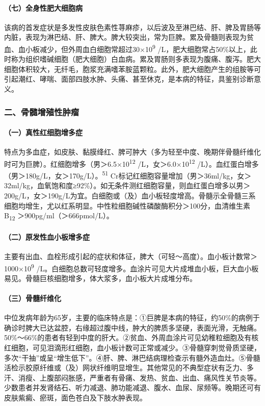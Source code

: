 \paragraph{（七）全身性肥大细胞病}

该病的首发症状是多发性皮肤色素性荨麻疹，以后波及至淋巴结、肝、脾及胃肠等内脏，表现为淋巴结、肝、脾大。脾大较突出，常为巨脾。累及骨髓则表现为贫血、血小板减少，但外周血白细胞常超过30×10\textsuperscript{9}
/L，肥大细胞常占50\%以上，此时称为组织嗜碱细胞（肥大细胞）白血病。累及胃肠则多表现为腹痛、腹泻。肥大细胞体积较大，无纤毛，胞浆充满嗜苯胺蓝颗粒。此外，肥大细胞产生的组胺等可引起潮红、哮喘、面部四肢水肿、头痛、甚至休克，是本病的特征，具鉴别诊断意义。

\subsubsection{二、骨髓增殖性肿瘤}

\paragraph{（一）真性红细胞增多症}

特点为多血症，如皮肤、黏膜绛红、脾可肿大（多为轻至中度、晚期伴骨髓纤维化时可为巨脾）。红细胞增多（男＞6.5×10\textsuperscript{12}
/L，女＞6.0×10\textsuperscript{12}
/L）。血红蛋白增多（男＞180g/L，女＞170g/L）。\textsuperscript{51}
Cr标记红细胞容量增加（男＞36ml/kg，女＞32ml/kg，血氧饱和度≥92\%）。如无条件测红细胞容量，则血红蛋白增多以男＞200g/L，女＞190g/L为宜。白细胞或（及）血小板轻度增高。骨髓示全骨髓三系细胞均增生，尤以红系明显。中性粒细胞碱性磷酸酶积分＞100分，血清维生素B\textsubscript{12}
＞900pg/ml（＞666pmol/L）。

\paragraph{（二）原发性血小板增多症}

主要有出血、血栓形成引起的症状和体征，脾大（可轻～高度）。血小板计数常＞1000×10\textsuperscript{9}
/L。白细胞总数可轻度增多。血涂片可见大片成堆血小板，巨大血小板易见。骨髓巨核细胞增多，体大浆多，血小板大片成堆分布。

\paragraph{（三）骨髓纤维化}

中位发病年龄为65岁，主要的临床特点是：①巨脾是本病的特征，约50\%的病例于确诊时脾大已达盆腔，右缘超过腹中线，肿大的脾质多坚硬，表面光滑，无触痛。50\%～66\%的患者有轻到中度的肝大。②贫血、外周血涂片可见幼稚粒细胞及有核红细胞，可见泪滴形红细胞，血小板计数可正常或减少。③骨髓穿刺觉骨质坚硬，多次“干抽”或呈“增生低下”。④肝、脾、淋巴结病理检查示有髓外造血灶。⑤骨髓活检示胶原纤维或（及）网状纤维明显增生。其他常见的不典型症状有乏力、多汗、消瘦、上腹部闷胀感，严重者有骨痛、发热、贫血、出血、痛风性关节炎等。少数患者并发肾结石、听力减退、肺功能减退、腹水、血尿、尿频等。晚期还可有皮肤紫癜、瘀斑，面色苍白及下肢水肿表现。

